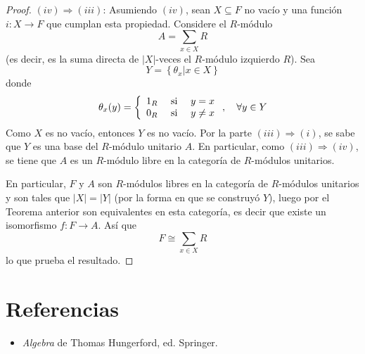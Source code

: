 \documentclass[12pt]{report}
\newcounter{it}
\theoremstyle{largebreak}
\newcommand\abs[1]{\ensuremath{\big|#1\big|}}
\newcommand\cf[3]{\ensuremath{#1:#2\rightarrow#3}}
\begin{document}
\begin{proof}
        $(iv)\Rightarrow(iii)$: Asumiendo $(iv)$, sean $X\subseteq F$ no vacío y una función $\cf{i}{X}{F}$ que cumplan esta propiedad. Considere el $R$-módulo
        \begin{equation*}
            A=\sum_{ x\in X}R
        \end{equation*}
        (es decir, es la suma directa de $\abs{X}$-veces el $R$-módulo izquierdo $R$). Sea
        \begin{equation*}
            Y=\left\{\theta_x\Big| x\in X \right\}
        \end{equation*}
        donde
        \begin{equation*}
            \theta_x(y)=\left\{
                \begin{array}{lcr}
                    1_R & \textup{ si } & y=x\\
                    0_R & \textup{ si } & y\neq x\\
                \end{array}
            \right.,\quad\forall y\in Y
        \end{equation*}
        Como $X$ es no vacío, entonces $Y$ es no vacío. Por la parte $(iii)\Rightarrow(i)$, se sabe que $Y$ es una base del $R$-módulo unitario $A$. En particular, como $(iii)\Rightarrow(iv)$, se tiene que $A$ es un $R$-módulo libre en la categoría de $R$-módulos unitarios.
        
        En particular, $F$ y $A$ son $R$-módulos libres en la categoría de $R$-módulos unitarios y son tales que $\abs{X}=\abs{Y}$ (por la forma en que se construyó $Y$), luego por el Teorema anterior son equivalentes en esta categoría, es decir que existe un isomorfismo $\cf{f}{F}{A}$. Así que
        \begin{equation*}
            F\cong\sum_{ x\in X}R
        \end{equation*}
        lo que prueba el resultado.
    \end{proof}

    \section{Referencias}

    \begin{itemize}
        \item \textit{Algebra} de Thomas Hungerford, ed. Springer.
    \end{itemize}
\end{document}
